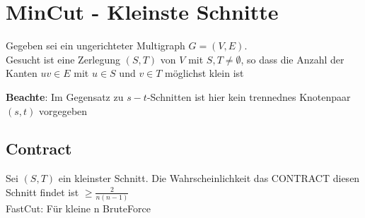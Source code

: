 \documentclass[14pt]{article}
\begin{document}
\section{MinCut - Kleinste Schnitte}
\begin{definition}
    Gegeben sei ein ungerichteter Multigraph $G = (V, E)$. \\
    Gesucht ist eine Zerlegung $(S, T)$ von $V$ mit $S, T \neq
    \emptyset$, so dass die Anzahl der Kanten $uv \in E$ mit 
    $u \in S$ und $v \in T$ möglichst klein ist
\end{definition}
\textbf{Beachte}: Im Gegensatz zu $s-t$-Schnitten ist hier kein
trennednes Knotenpaar $(s, t)$ vorgegeben 
\subsection*{Contract}
Sei $(S, T)$ ein kleinster Schnitt. Die Wahrscheinlichkeit das
CONTRACT diesen Schnitt findet ist $\geq \frac{2}{n(n - 1)}$ \\
FastCut: Für kleine n BruteForce
\end{document}

